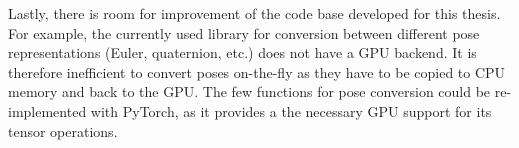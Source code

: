 Lastly, there is room for improvement of the code base developed for this thesis.
For example, the currently used library for conversion between different pose representations (Euler, quaternion, etc.) does not have a GPU backend.
It is therefore inefficient to convert poses on-the-fly as they have to be copied to CPU memory and back to the GPU.
The few functions for pose conversion could be re-implemented with PyTorch, as it provides a the necessary GPU support for its tensor operations.
